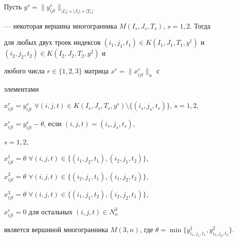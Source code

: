 \begin{lem}


Пусть $y^s=\|y_{ijt}^s\|_{|I_s|\times |J_s|\times |T_s|}$


--- некоторая вершина многогранника $M(I_s,J_s,T_s)$, $s=1,2$. Тогда


для любых двух троек индексов $(i_1,j_1,t_1)\in


K(I_1,J_1,T_1,y^1)$ и $(i_2,j_2,t_2)\in K(I_2,J_2,T_2,y^2)$ и


любого числа $r\in \{1,2,3\}$ матрица $x^r=\|x^r_{ijt}\|_n$ с


элементами





$x_{ijt}^r=y_{ijt}^s$ $\forall (i,j,t)\in


K(I_s,J_s,T_s,y^s)\setminus \{(i_s,j_s,t_s)\}$, $s=1,2$,





$x_{ijt}^r=y_{ijt}^s-\theta$, если $(i,j,t)=(i_s,j_s,t_s)$,


$s=1,2$,





$x_{ijt}^1=\theta$ $\forall (i,j,t)\in


\{(i_1,j_2,t_1),(i_2,j_1,t_2)\}$,





$x_{ijt}^2=\theta$ $\forall (i,j,t)\in


\{(i_2,j_1,t_1),(i_1,j_2,t_2)\}$,





$x_{ijt}^3=\theta$ $\forall (i,j,t)\in


\{(i_1,j_1,t_2),(i_2,j_2,t_1)\}$,





$x_{ijt}^r=0$ для остальных $(i,j,t)\in N_n^3$





\noindent{}является вершиной многогранника $M(3,n)$, где $\theta=\min


\{y_{i_1,j_1,t_1}^1, y_{i_2,j_2,t_2}^2 \}$.


\end{lem}





